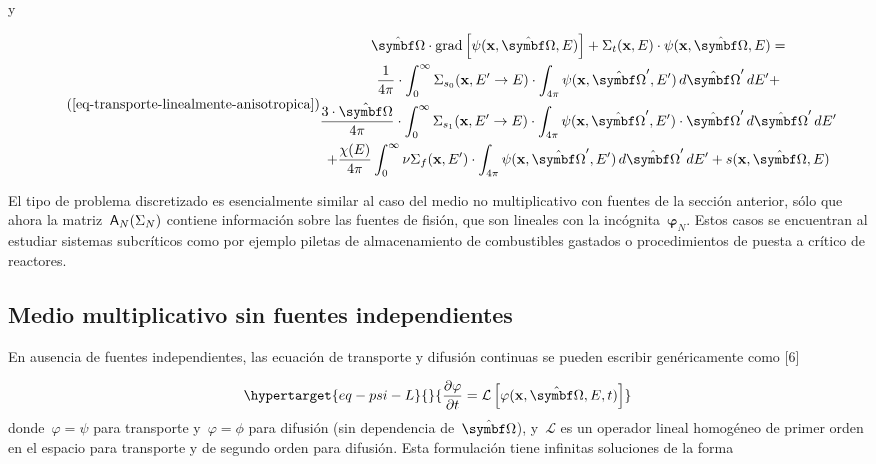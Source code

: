 \documentclass[
  12pt,
  a4paper,
  table]{scrbook}
\theoremstyle{plain}
\theoremstyle{definition}
\theoremstyle{plain}
\theoremstyle{plain}
\theoremstyle{remark}
\begin{document}
y

\[ \tag{\ref{eq-transporte-linealmente-anisotropica}}
\begin{gathered}
 \omegaversor \cdot \text{grad} \left[ \psi(\vec{x}, \omegaversor, E) \right]
 + \Sigma_t(\vec{x}, E) \cdot \psi(\vec{x}, \omegaversor, E) = \\
\frac{1}{4\pi} \cdot 
\int_{0}^{\infty} \Sigma_{s_0}(\vec{x}, E^{\prime} \rightarrow E) \cdot \int_{4\pi} \psi(\vec{x}, \omegaprimaversor, E^{\prime}) \, d\omegaprimaversor \, dE^\prime + \\
\frac{3 \cdot \omegaversor}{4\pi} \cdot
\int_{0}^{\infty} \Sigma_{s_1}(\vec{x}, E^{\prime} \rightarrow E) \cdot \int_{4\pi} \psi(\vec{x}, \omegaprimaversor, E^{\prime}) \cdot \omegaprimaversor \, d\omegaprimaversor \, dE^\prime  \\
+ \frac{\chi(E)}{4\pi} \int_{0}^{\infty} \nu\Sigma_f(\vec{x}, E^\prime) \cdot \int_{4\pi} \psi(\vec{x}, \omegaprimaversor, E^{\prime}) \, d\omegaprimaversor \, dE^\prime 
+ s(\vec{x}, \omegaversor, E)
\end{gathered}
\]

El tipo de problema discretizado es esencialmente similar al caso del
medio no multiplicativo con fuentes de la sección anterior, sólo que
ahora la matriz~\(\mathsf{A}_N(\Sigma_N)\) contiene información sobre las
fuentes de fisión, que son lineales con la
incógnita~\(\symbf{\varphi}_N\). Estos casos se encuentran al estudiar
sistemas subcríticos como por ejemplo piletas de almacenamiento de
combustibles gastados o procedimientos de puesta a crítico de reactores.

\hypertarget{medio-multiplicativo-sin-fuentes-independientes}{%
\subsection{Medio multiplicativo sin fuentes
independientes}\label{medio-multiplicativo-sin-fuentes-independientes}}

En ausencia de fuentes independientes, las ecuación de transporte y
difusión continuas se pueden escribir genéricamente como {[}6{]}

\begin{equation}\protect\hypertarget{eq-psi-L}{}{
\frac{\partial \varphi}{\partial t} = \mathcal{L}\left[\varphi(\vec{x},\omegaversor, E,t)\right]
}\label{eq-psi-L}\end{equation} donde~\(\varphi = \psi\) para transporte
y~\(\varphi = \phi\) para difusión (sin dependencia
de~\(\omegaversor\)), y~\(\mathcal{L}\) es un operador lineal homogéneo
de primer orden en el espacio para transporte y de segundo orden para
difusión. Esta formulación tiene infinitas soluciones de la forma
\end{document}
